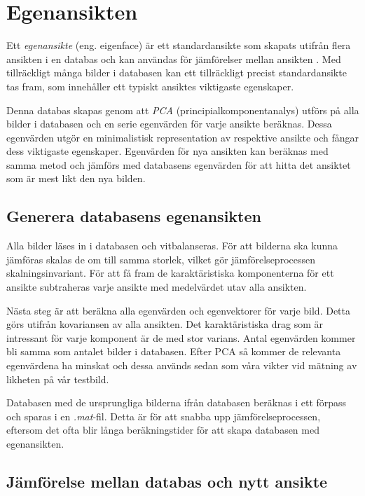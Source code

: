 \documentclass[a4paper,12pt,oneside,final]{extbook}
\begin{document}
\section{Egenansikten}

Ett \textit{egenansikte} (eng. eigenface) är ett standardansikte som skapats utifrån flera ansikten i en databas och kan användas för jämförelser mellan ansikten \cite{eigenface}. Med tillräckligt många bilder i databasen kan ett tillräckligt precist standardansikte tas fram, som innehåller ett typiskt ansiktes viktigaste egenskaper.

Denna databas skapas genom att \textit{PCA} (principialkomponentanalys) utförs på alla bilder i databasen och en serie egenvärden för varje ansikte beräknas. Dessa egenvärden utgör en minimalistisk representation av respektive ansikte och fångar dess viktigaste egenskaper. Egenvärden för nya ansikten kan beräknas med samma metod och jämförs med databasens egenvärden för att hitta det ansiktet som är mest likt den nya bilden.

\subsection{Generera databasens egenansikten}

Alla bilder läses in i databasen och vitbalanseras. För att bilderna ska kunna jämföras skalas de om till samma storlek, vilket gör jämförelseprocessen skalningsinvariant. För att få fram de karaktäristiska komponenterna för ett ansikte subtraheras varje ansikte med medelvärdet utav alla ansikten.

Nästa steg är att beräkna alla egenvärden och egenvektorer för varje bild. Detta görs utifrån kovariansen av alla ansikten. Det karaktäristiska drag som är intressant för varje komponent är de med stor varians. Antal egenvärden kommer bli samma som antalet bilder i databasen. Efter PCA så kommer de relevanta egenvärdena ha minskat och dessa används sedan som våra vikter vid mätning av likheten på vår testbild.

Databasen med de ursprungliga bilderna ifrån databasen beräknas i ett förpass och sparas i en \textit{.mat}-fil. Detta är för att snabba upp jämförelseprocessen, eftersom det ofta blir långa beräkningstider för att skapa databasen med egenansikten.

\subsection{Jämförelse mellan databas och nytt ansikte}
\end{document}

